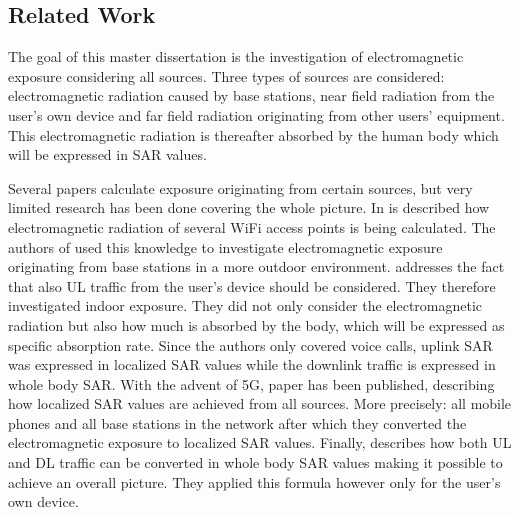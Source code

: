 
\subsection{Related Work} %
\label{sub:general}
The goal of this master dissertation is the investigation of electromagnetic exposure considering all sources. Three types of sources are considered: electromagnetic radiation 
caused by base stations, near field radiation from the user's own device and far field radiation originating from other users' equipment. This electromagnetic radiation is thereafter
absorbed by the human body which will be expressed in \gls{SAR} values.

Several papers calculate exposure originating from certain sources, but very  limited research has been done covering the whole picture.
In \cite{J6_originalExposureFormula} is described how electromagnetic radiation of several WiFi access points is being calculated. The authors of \cite{J1} used this knowledge 
to investigate electromagnetic exposure originating from base stations in a more outdoor environment. \cite{J10_RDP, J10.1} addresses the fact that 
also \gls{UL} traffic from the user's device should be considered. They therefore investigated indoor exposure. They did not only consider the electromagnetic radiation
but also how much is absorbed by the body, which will be expressed as specific absorption rate. Since the authors only covered voice calls,
uplink SAR was expressed in localized SAR values while the downlink traffic is expressed in whole body SAR. With the advent of 5G, paper \cite{J17_kuehn2019modelling} has been 
published, describing how localized SAR values are achieved from all sources. More precisely: all mobile phones and all base stations in the network after which they converted the electromagnetic 
exposure to localized SAR values.
Finally, \cite{J22_plets2015joint} describes how both \gls{UL} and \gls{DL} traffic can be converted in whole body SAR values making it possible to achieve an overall picture. They applied this formula 
however only for the user's own device.

